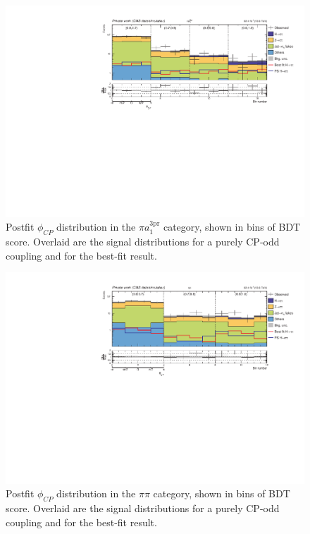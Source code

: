 \begin{figure}[!htbp]
    \centering
    \includegraphics[width=1\textwidth]{Figures/Chapter7/postfit/htt_tt_9_13p6TeV.pdf}
    \caption[Postfit $\phi_{CP}$ distribution in the $\pi a_1^\text{3pr}$ category.]
    {Postfit $\phi_{CP}$ distribution in the $\pi a_1^\text{3pr}$ category, shown in bins of \ac{BDT} score. Overlaid are the signal distributions for a purely CP-odd coupling and for the best-fit result.}
    \label{Figure:Chapter7_Postfit_Unrolled_4}
\end{figure}

\begin{figure}[!htbp]
    \centering
    \includegraphics[width=1\textwidth]{Figures/Chapter7/postfit/htt_tt_8_13p6TeV.pdf}
    \caption[Postfit $\phi_{CP}$ distribution in the $\pi \pi$ category.]
    {Postfit $\phi_{CP}$ distribution in the $\pi \pi$ category, shown in bins of \ac{BDT} score. Overlaid are the signal distributions for a purely CP-odd coupling and for the best-fit result.}
    \label{Figure:Chapter7_Postfit_Unrolled_5}
\end{figure}

